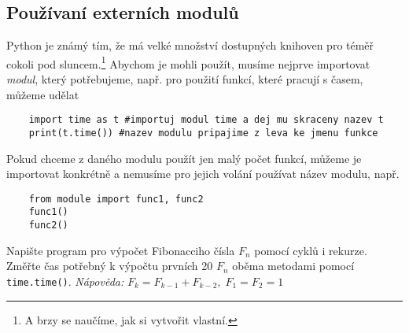 \subsection{Používaní externích modulů}
Python je známý tím, že má velké množství dostupných knihoven pro téměř cokoli pod sluncem.\footnote{A brzy se naučíme, jak si vytvořit vlastní.} Abychom je mohli použít, musíme nejprve importovat \emph{modul}, který potřebujeme, např. pro použití funkcí, které pracují s časem, můžeme udělat
\begin{lstlisting}
    import time as t #importuj modul time a dej mu skraceny nazev t
    print(t.time()) #nazev modulu pripajime z leva ke jmenu funkce
\end{lstlisting}
Pokud chceme z daného modulu použít jen malý počet funkcí, můžeme je importovat konkrétně a nemusíme pro jejich volání používat název modulu, např.
\begin{lstlisting}
    from module import func1, func2
    func1()
    func2()
\end{lstlisting}

\begin{exercise}
    Napište program pro výpočet Fibonacciho čísla $F_n$ pomocí cyklů i rekurze. Změřte čas potřebný k výpočtu prvních 20 $F_n$ oběma metodami pomocí \verb|time.time()|.
    \emph{Nápověda:} $F_k = F_{k-1} + F_{k-2},\;F_1 = F_2 = 1$
\end{exercise}